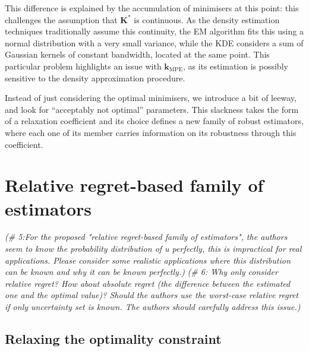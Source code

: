 \documentclass[preprint, review, 1p]{elsarticle}
\newcommand{\kmpe}{{\mathbf{k}}_{\mathrm{MPE}}}
\newcommand{\elise}[1]{{\itshape\color{red} ({#1})}}
\newcommand{\victor}[1]{{\itshape\color{green} ({#1})}}
\begin{document}
This difference is explained by the accumulation of minimisers at this point: this challenges the assumption that $\mathbf{K}^*$ is continuous. As the density estimation techniques traditionally assume this continuity, the EM algorithm fits this using a normal distribution with a very small variance, while the KDE considers a sum of Gaussian kernels of constant bandwidth, located at the same point. This particular problem highlights an issue with $\kmpe$, as its estimation is possibly sensitive to the density approximation procedure.


Instead of just considering the optimal minimisers, we introduce a bit of leeway, and look for ``acceptably not optimal'' parameters.
 This slackness takes the form of a relaxation coefficient and its choice defines a new family of robust estimators, where each one of its member carries information on its robustness through this coefficient.




 \section{Relative regret-based family of estimators}%
 \victor{\# 5:For the proposed "relative regret-based family of estimators", the authors seem to know the probability distribution of u perfectly, this is impractical for real applications. Please consider some realistic applications where this distribution can be known and why it can be known perfectly.}
\victor{\# 6: Why only consider relative regret? How about absolute regret (the difference between the estimated one and the optimal value)? Should the authors use the worst-case relative regret if only uncertainty set is known. The authors should carefully address this issue.}
\label{sec:relax_constraint}
\subsection{Relaxing the optimality constraint}
\end{document}
